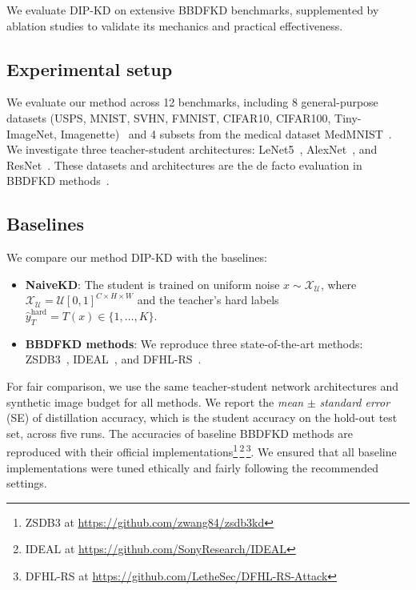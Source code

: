 \begin{foldable} %
  We evaluate DIP-KD on extensive BBDFKD benchmarks, supplemented by ablation studies to validate its mechanics and practical effectiveness.
\end{foldable}

\subsection{Experimental setup} \label{ssec:04-experiments-setup}
\begin{foldable} %
  We evaluate our method across 12 benchmarks, including 8 general-purpose datasets (USPS, MNIST, SVHN, FMNIST, CIFAR10, CIFAR100, Tiny-ImageNet, Imagenette)~\cite{lecun2002gradient,hull1994database,netzer2011reading,xiao2017fashion,krizhevsky2009learning,le2015tiny,howard2020imagenette} and 4 subsets from the medical dataset MedMNIST~\cite{yang2021medmnist}.
  We investigate three teacher-student architectures: LeNet5~\cite{lecun2002gradient}, AlexNet~\cite{krizhevsky2012imagenet}, and ResNet~\cite{he2016deep}.
  These datasets and architectures are the de facto evaluation in BBDFKD methods~\cite{wang2021zero, zhang2022ideal, yuan2024data}.
\end{foldable}

\subsection{Baselines} \label{ssec:04-experiments-baselines}
\begin{foldable} %
  We compare our method DIP-KD with the baselines:
  \begin{itemize}
    \item \textbf{NaiveKD}: The student is trained on uniform noise $x \sim \mathcal{X}_\mathcal{U}$, where $\mathcal{X}_\mathcal{U}=\mathcal{U}[0,1]^{C \times H \times W}$ and the teacher's hard labels $\hat{y}_{T}^\text{hard} = T(x) \in \{1, \ldots, K\}$.
    \item \textbf{BBDFKD methods}: We reproduce three state-of-the-art methods: ZSDB3~\cite{wang2021zero}, IDEAL~\cite{zhang2022ideal}, and DFHL-RS~\cite{yuan2024data}.
  \end{itemize}
  For fair comparison, we use the same teacher-student network architectures and synthetic image budget for all methods.
  We report the \textit{mean} $\pm$ \textit{standard error} (SE) of distillation accuracy, which is the student accuracy on the hold-out test set, across five runs.
  The accuracies of baseline BBDFKD methods are reproduced with their official implementations\footnote{ZSDB3 at \url{https://github.com/zwang84/zsdb3kd}}\,\footnote{IDEAL at \url{https://github.com/SonyResearch/IDEAL}}\,\footnote{DFHL-RS at \url{https://github.com/LetheSec/DFHL-RS-Attack}}.
  We ensured that all baseline implementations were tuned ethically and fairly following the recommended settings.
\end{foldable}

